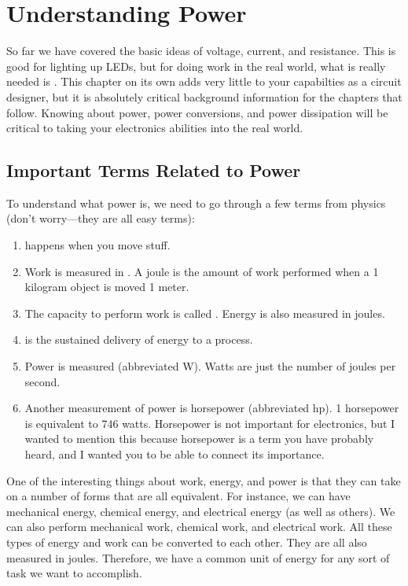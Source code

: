 \chapter{Understanding Power}
\label{chappower}

So far we have covered the basic ideas of voltage, current, and resistance.
This is good for lighting up LEDs, but for doing work in the real world, what is really needed is .
This chapter on its own adds very little to your capabilties as a circuit designer, but it is absolutely critical background information for the chapters that follow.
Knowing about power, power conversions, and power dissipation will be critical to taking your electronics abilities into the real world.

\section{Important Terms Related to Power}

To understand what power is, we need to go through a few terms from physics (don't worry---they are all easy terms):

\begin{enumerate}
\item {} happens when you move stuff.  
\item Work is measured in . A joule is the amount of work performed when a 1 kilogram object is moved 1 meter.
\item The capacity to perform work is called .  Energy is also measured in joules.
\item {} is the sustained delivery of energy to a process.  
\item Power is measured  (abbreviated W).  Watts are just the number of joules per second.
\item Another measurement of power is horsepower (abbreviated hp).  1 horsepower is equivalent to 746 watts.  Horsepower is not important for electronics, but I wanted to mention this because horsepower is a term you have probably heard, and I wanted you to be able to connect its importance.
\end{enumerate}

One of the interesting things about work, energy, and power is that they can take on a number of forms that are all equivalent.
For instance, we can have mechanical energy, chemical energy, and electrical energy (as well as others).
We can also perform mechanical work, chemical work, and electrical work.
All these types of energy and work can be converted to each other.
They are all also measured in joules.
Therefore, we have a common unit of energy for any sort of task we want to accomplish.

